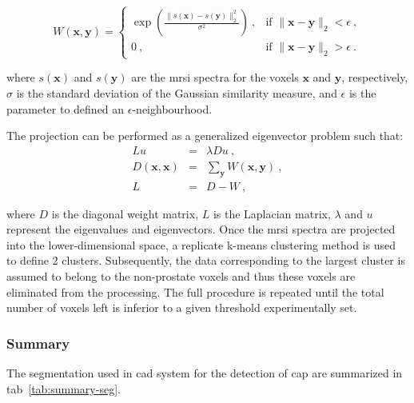 \begin{equation}
	W(\mathbf{x},\mathbf{y}) =
	\begin{cases}	
	 	\exp \left( \frac{\| s(\mathbf{x}) - s(\mathbf{y}) \|_2^2}{\sigma^2} \right) \ , & \text{if } \| \mathbf{x} - \mathbf{y} \|_2 < \epsilon \ , \\
	 	0 \ , & \text{if } \| \mathbf{x} - \mathbf{y} \|_2 > \epsilon \ .
	 \end{cases}
	\label{eq:ge1}
\end{equation}

\noindent where $s(\mathbf{x})$ and $s(\mathbf{y})$ are the \ac{mrsi} spectra for the voxels $\mathbf{x}$ and $\mathbf{y}$, respectively, $\sigma$ is the standard deviation of the Gaussian similarity measure, and $\epsilon$ is the parameter to defined an $\epsilon$-neighbourhood.

The projection can be performed as a generalized eigenvector problem such that:
\begin{eqnarray}
  Lu & = & \lambda D u \ , \nonumber \\
  D(\mathbf{x},\mathbf{x}) & = & \sum_{\mathbf{y}} W(\mathbf{x},\mathbf{y}) \ , \label{eq:ge2} \\
  L & = & D-W \ , \nonumber
\end{eqnarray}

\noindent where $D$ is the diagonal weight matrix, $L$ is the Laplacian matrix, $\lambda$ and $u$ represent the eigenvalues and eigenvectors.
Once the \ac{mrsi} spectra are projected into the lower-dimensional space, a replicate k-means clustering method is used to define 2 clusters.
Subsequently, the data corresponding to the largest cluster is assumed to belong to the non-prostate voxels and thus these voxels are eliminated from the processing.
The full procedure is repeated until the total number of voxels left is inferior to a given threshold experimentally set.


\subsubsection{Summary}

The segmentation used in \ac{cad} system for the detection of \ac{cap} are summarized in \ac{tab}~\ref{tab:summary-seg}.

